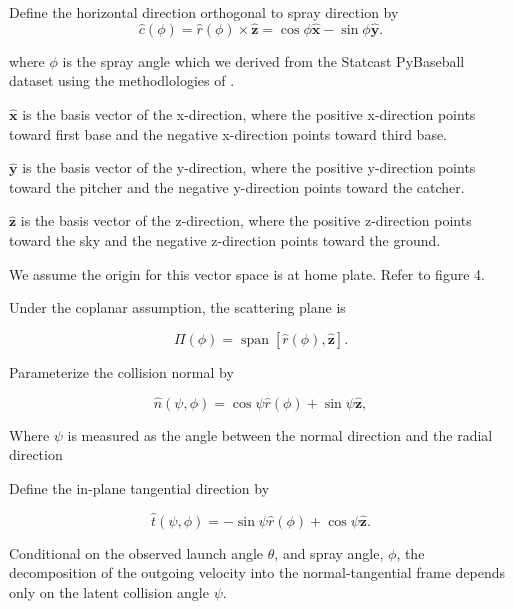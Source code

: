 \documentclass[11pt]{article}
\begin{document}
Define the horizontal direction orthogonal to spray direction by
\begin{equation}
\hat{c}(\phi) = \hat{r}(\phi) \times \hat{\mathbf{z}}
= \cos \phi \hat{\mathbf{x}} - \sin \phi  \hat{\mathbf{y}} .
\tag{5}
\end{equation}

where \(\phi\) is the spray angle which we derived from the Statcast PyBaseball dataset using the methodlologies of \citep{petti2017statcastexport}.

\(\hat{\mathbf{x}}\) is the basis vector of the x-direction, where the positive x-direction points toward first base and the negative x-direction points toward third base.

\(\hat{\mathbf{y}}\) is the basis vector of the y-direction, where the positive y-direction points toward the pitcher and the negative y-direction points toward the catcher.

\(\hat{\mathbf{z}}\) is the basis vector of the z-direction, where the positive z-direction points toward the sky and the negative z-direction points toward the ground.

We assume the origin for this vector space is at home plate. Refer to figure 4. 

Under the coplanar assumption, the scattering plane is

\begin{equation}
\Pi(\phi) = \operatorname{span}\left[\hat{r}(\phi), \hat{\mathbf{z}}\right].
\tag{6}
\end{equation}



Parameterize the collision normal by

\begin{equation}
\hat{n}(\psi, \phi) = \cos \psi \hat{r}(\phi) + \sin \psi \hat{\mathbf{z}} ,
\tag{7}
\end{equation}

Where \(\psi\) is measured as the angle between the normal direction and the radial direction

Define the in-plane tangential direction by

\begin{equation}
\hat{t}(\psi, \phi) = - \sin \psi \hat{r}(\phi) + \cos \psi \hat{\mathbf{z}} .
\tag{8}
\end{equation}

Conditional on the observed launch angle \(\theta\), and spray angle, \(\phi\), the decomposition of the outgoing velocity into the normal-tangential frame depends only on the latent collision angle \(\psi\).
\end{document}
